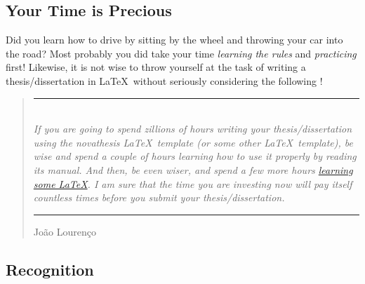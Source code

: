 \subsection{Your Time is Precious}
\label{sub:time_is_money}

Did you learn how to drive by sitting by the wheel and throwing your car into the road?  Most probably you did take your time \emph{learning the rules} and \emph{practicing} first! Likewise, it is not wise to throw yourself at the task of writing a thesis/dissertation in \LaTeX\ without seriously considering the following !


\bgroup
\renewcommand{\mkcitation}[1]{\\[0ex]\parbox{\linewidth}{\hfill\textbf{#1}}}
\blockquote[João Lourenço]{%
  \rule{\linewidth}{2pt}\\\itshape
  If you are going to spend zillions of hours writing your thesis/dissertation using the \gls{novathesis} \LaTeX\ template (or some other \LaTeX\ template), be wise and spend a couple of hours learning how to use it properly by reading its manual.  And then, be even wiser, and spend a few more hours \href{https://github.com/joaomlourenco/novathesis/wiki\#learning-latex}{learning some \LaTeX}.  I am sure that the time you are investing now will pay itself countless times before you submit your thesis/dissertation.\\\nopagebreak
  \rule{\linewidth}{2pt}%
}
\egroup

\subsection{Recognition}
\label{sub:recognition}


